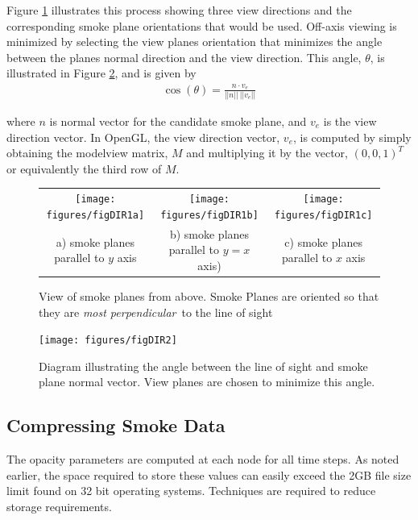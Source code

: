 Figure \ref{figDIRA} illustrates this process showing three view
directions and the corresponding smoke plane orientations that
would be used. Off-axis viewing is minimized by selecting the view
planes orientation that minimizes the angle between the planes
normal direction and the view direction. This angle, $\theta$, is
illustrated in Figure \ref{figDIRB}, and is given by
\begin{eqnarray*}
\cos(\theta)=\frac{n\cdot v_e}{||n||~||v_e||}
\end{eqnarray*}

\noindent where $n$ is normal vector for the candidate smoke
plane, and $v_e$ is the view direction vector.  In OpenGL, the
view direction vector, $v_e$, is computed by simply obtaining the
modelview matrix, $M$ and multiplying it by the vector,
$(0,0,1)^T$ or equivalently the third row of $M$.

\begin{figure}
\begin{tabular}{ccc}
\texttt{[image: figures/figDIR1a]}&
\texttt{[image: figures/figDIR1b]}&
\texttt{[image: figures/figDIR1c]}\\
a) smoke planes parallel to $y$ axis& b) smoke planes parallel to
$y=x$ axis)&
c) smoke planes parallel to $x$ axis\\
\end{tabular}
\caption{View of smoke planes from above.  Smoke Planes are
oriented so that they are {\em most perpendicular}\ to the line of sight }
\label{figDIRA}
\end{figure}

\begin{figure}
\centerline{\texttt{[image: figures/figDIR2]}}
\caption{Diagram illustrating the angle between the line of sight
and smoke plane normal vector.  View planes are chosen to minimize
this angle.} \label{figDIRB}
\end{figure}

%
%

\subsection{Compressing Smoke Data}

The opacity parameters are computed at each node for all time
steps. As noted earlier, the space required to store these values
can easily exceed the 2GB file size limit found on 32 bit
operating systems. Techniques are required to reduce storage
requirements.

